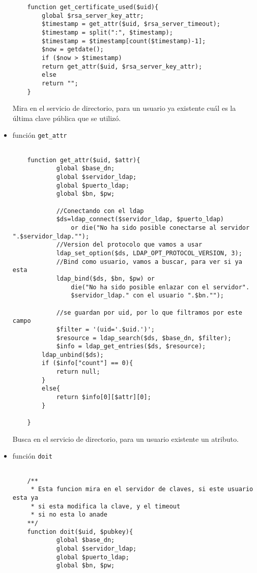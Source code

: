 \begin{itemize}
\begin{lstlisting}
    function get_certificate_used($uid){
        global $rsa_server_key_attr;
        $timestamp = get_attr($uid, $rsa_server_timeout);
        $timestamp = split(":", $timestamp);
        $timestamp = $timestamp[count($timestamp)-1];
        $now = getdate();
        if ($now > $timestamp)
        return get_attr($uid, $rsa_server_key_attr);
        else
        return "";
    }

    \end{lstlisting}

    Mira en el servicio de directorio, para un usuario ya existente cuál es
    la última clave pública que se utilizó.

    \item función \texttt{get\_attr}
    \begin{lstlisting}

    function get_attr($uid, $attr){
            global $base_dn;
            global $servidor_ldap;
            global $puerto_ldap;
            global $bn, $pw;

            //Conectando con el ldap
            $ds=ldap_connect($servidor_ldap, $puerto_ldap)
                or die("No ha sido posible conectarse al servidor ".$servidor_ldap."");
            //Version del protocolo que vamos a usar
            ldap_set_option($ds, LDAP_OPT_PROTOCOL_VERSION, 3);
            //Bind como usuario, vamos a buscar, para ver si ya esta
            ldap_bind($ds, $bn, $pw) or
                die("No ha sido posible enlazar con el servidor".
                $servidor_ldap." con el usuario ".$bn."");

            //se guardan por uid, por lo que filtramos por este campo
            $filter = '(uid='.$uid.')';
            $resource = ldap_search($ds, $base_dn, $filter);
            $info = ldap_get_entries($ds, $resource);
        ldap_unbind($ds);
        if ($info["count"] == 0){
            return null;
        }
        else{
            return $info[0][$attr][0];
        }

    }
    \end{lstlisting}

    Busca en el servicio de directorio, para un usuario existente un
    atributo.

    \item función \texttt{doit}
    \begin{lstlisting}

    /**
     * Esta funcion mira en el servidor de claves, si este usuario esta ya
     * si esta modifica la clave, y el timeout
     * si no esta lo anade
    **/
    function doit($uid, $pubkey){
            global $base_dn;
            global $servidor_ldap;
            global $puerto_ldap;
            global $bn, $pw;


\end{lstlisting}
\end{itemize}
